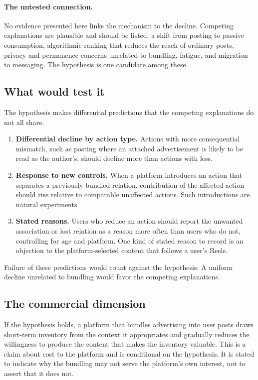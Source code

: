 \paragraph{The untested connection.} No evidence presented here links the mechanism to the decline. Competing explanations are plausible and should be listed: a shift from posting to passive consumption, algorithmic ranking that reduces the reach of ordinary posts, privacy and permanence concerns unrelated to bundling, fatigue, and migration to messaging. The hypothesis is one candidate among these.

\subsection{What would test it}

The hypothesis makes differential predictions that the competing explanations do not all share.

\begin{enumerate}
  \item \textbf{Differential decline by action type.} Actions with more consequential mismatch, such as posting where an attached advertisement is likely to be read as the author's, should decline more than actions with less.
  \item \textbf{Response to new controls.} When a platform introduces an action that separates a previously bundled relation, contribution of the affected action should rise relative to comparable unaffected actions. Such introductions are natural experiments.
  \item \textbf{Stated reasons.} Users who reduce an action should report the unwanted association or lost relation as a reason more often than users who do not, controlling for age and platform. One kind of stated reason to record is an objection to the platform-selected content that follows a user's Reels.
\end{enumerate}

Failure of these predictions would count against the hypothesis. A uniform decline unrelated to bundling would favor the competing explanations.

\subsection{The commercial dimension}

If the hypothesis holds, a platform that bundles advertising into user posts draws short-term inventory from the context it appropriates and gradually reduces the willingness to produce the content that makes the inventory valuable. This is a claim about cost to the platform and is conditional on the hypothesis. It is stated to indicate why the bundling may not serve the platform's own interest, not to assert that it does not.

